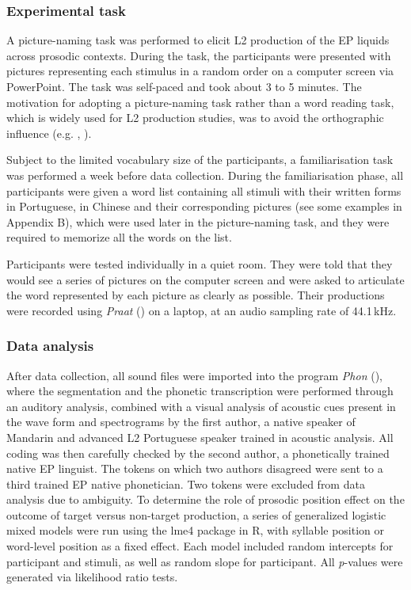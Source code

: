\documentclass[output=paper]{../langscibook}
\begin{document}
\subsubsection{Experimental task}


A picture-naming task was performed to elicit L2 production of the EP liquids across prosodic contexts. During the task, the participants were presented with pictures representing each stimulus in a random order on a computer screen via PowerPoint. The task was self-paced and took about 3 to 5 minutes. The motivation for adopting a picture-naming task rather than a word reading task, which is widely used for L2 production studies, was to avoid the orthographic influence (e.g. \citealt{Hayes-HarbMasuda2008}, \citealt{EscuderoWanrooij2010}).

Subject to the limited vocabulary size of the participants, a familiarisation task was performed a week before data collection. During the familiarisation phase, all participants were given a word list containing all stimuli with their written forms in Portuguese, in Chinese and their corresponding pictures (see some examples in Appendix B), which were used later in the picture-naming task, and they were required to memorize all the words on the list.

Participants were tested individually in a quiet room. They were told that they would see a series of pictures on the computer screen and were asked to articulate the word represented by each picture as clearly as possible. Their productions were recorded using \textit{Praat} (\citealt{BoersmaWeenink2016}) on a laptop, at an audio sampling rate of 44.1\,kHz.


\subsubsection{Data analysis}


After data collection, all sound files were imported into the program \textit{Phon} (\citealt{RoseMacWhinney2014}), where the segmentation and the phonetic transcription were performed through an auditory analysis, combined with a visual analysis of acoustic cues present in the wave form and spectrograms by the first author, a native speaker of Mandarin and advanced L2 Portuguese speaker trained in acoustic analysis. All coding was then carefully checked by the second author, a phonetically trained native EP linguist. The tokens on which two authors disagreed were sent to a third trained EP native phonetician. Two tokens were excluded from data analysis due to ambiguity. To determine the role of prosodic position effect on the outcome of target versus non-target production, a series of generalized logistic mixed models were run using the lme4 package \citep{BatesEtAl2015} in R, with syllable position or word-level position as a fixed effect. Each model included random intercepts for participant and stimuli, as well as random slope for participant. All \textit{p}{}-values were generated via likelihood ratio tests.
\end{document}
